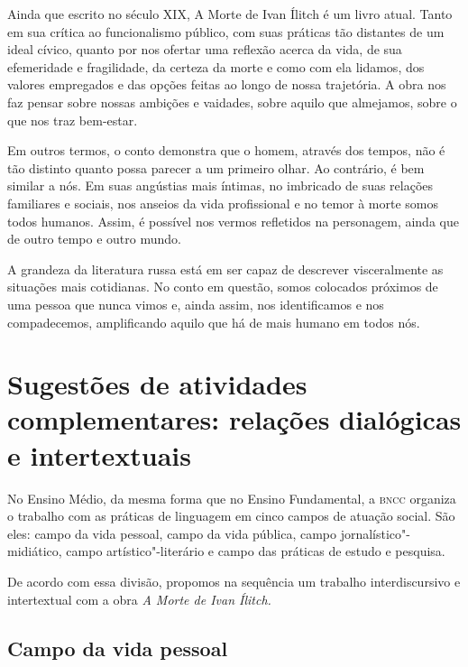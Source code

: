 \documentclass[12pt]{extarticle}
\begin{document}
Ainda que escrito no século XIX, A Morte de Ivan Ílitch é um livro
atual. Tanto em sua crítica ao funcionalismo público, com suas práticas
tão distantes de um ideal cívico, quanto por nos
ofertar uma reflexão acerca da vida, de sua efemeridade e fragilidade,
da certeza da morte e como com ela lidamos, dos valores empregados e das
opções feitas ao longo de nossa trajetória. A obra nos faz pensar sobre nossas
ambições e vaidades, sobre aquilo que almejamos, sobre o que nos traz
bem-estar.

Em outros termos, o conto demonstra que o homem, através dos tempos, não
é tão distinto quanto possa parecer a um primeiro olhar. Ao contrário, é
bem similar a nós. Em suas angústias mais íntimas, no imbricado de suas
relações familiares e sociais, nos anseios da vida profissional e no
temor à morte somos todos humanos. Assim, é possível nos vermos
refletidos na personagem, ainda que de outro tempo e outro mundo.

A grandeza da literatura russa está em ser capaz de descrever
visceralmente as situações mais cotidianas. No conto em questão, somos
colocados próximos de uma pessoa que nunca vimos e, ainda assim, nos identificamos e nos
compadecemos, amplificando aquilo que há de mais humano em todos nós.






\section{Sugestões de atividades complementares: relações dialógicas e
intertextuais}


No Ensino Médio, da mesma forma que no Ensino Fundamental, a \textsc{bncc}
organiza o trabalho com as práticas de linguagem em cinco campos
de atuação social. São eles: campo da vida pessoal, campo da vida
pública, campo jornalístico"-midiático, campo artístico"-literário e campo
das práticas de estudo e pesquisa.

De acordo com essa divisão, propomos na sequência um trabalho
interdiscursivo e intertextual com a obra \emph{A Morte de Ivan Ílitch.}

\subsection{Campo da vida pessoal}
\end{document}
